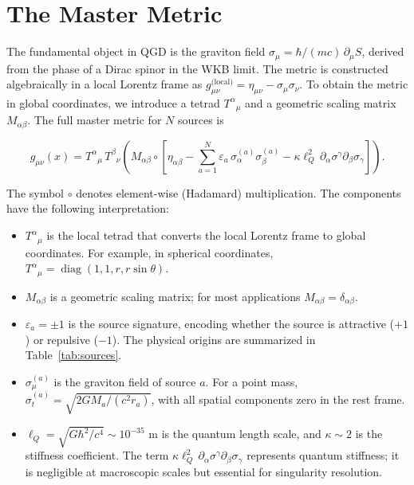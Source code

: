 \documentclass[12pt,prd,preprintnumbers,amsmath,amssymb]{revtex4-2}
\theoremstyle{definition}
\theoremstyle{remark}
\begin{document}
\section{The Master Metric}

The fundamental object in QGD is the graviton field $\sigma_\mu = \hbar/(mc)\,\partial_\mu S$, derived from the phase of a Dirac spinor in the WKB limit. The metric is constructed algebraically in a local Lorentz frame as $g_{\mu\nu}^{\text{(local)}} = \eta_{\mu\nu} - \sigma_\mu\sigma_\nu$. To obtain the metric in global coordinates, we introduce a tetrad $T^\alpha{}_\mu$ and a geometric scaling matrix $M_{\alpha\beta}$. The full master metric for $N$ sources is

\begin{equation}
\boxed{g_{\mu\nu}(x) = T^\alpha{}_\mu\,T^\beta{}_\nu\!\left(M_{\alpha\beta}\circ\!\left[\eta_{\alpha\beta} - \sum_{a=1}^N\varepsilon_a\,\sigma_\alpha^{(a)}\sigma_\beta^{(a)} - \kappa\ell_Q^2\,\partial_\alpha\sigma^\gamma\partial_\beta\sigma_\gamma\right]\right).}
\label{eq:master_metric}
\end{equation}

The symbol $\circ$ denotes element-wise (Hadamard) multiplication. The components have the following interpretation:

\begin{itemize}
\item $T^\alpha{}_\mu$ is the local tetrad that converts the local Lorentz frame to global coordinates. For example, in spherical coordinates, $T^\alpha{}_\mu = \operatorname{diag}(1,1,r,r\sin\theta)$.
\item $M_{\alpha\beta}$ is a geometric scaling matrix; for most applications $M_{\alpha\beta} = \delta_{\alpha\beta}$.
\item $\varepsilon_a = \pm 1$ is the source signature, encoding whether the source is attractive ($+1$) or repulsive ($-1$). The physical origins are summarized in Table~\ref{tab:sources}.
\item $\sigma_\mu^{(a)}$ is the graviton field of source $a$. For a point mass, $\sigma_t^{(a)} = \sqrt{2GM_a/(c^2 r_a)}$, with all spatial components zero in the rest frame.
\item $\ell_Q = \sqrt{G\hbar^2/c^4} \sim 10^{-35}$ m is the quantum length scale, and $\kappa \sim 2$ is the stiffness coefficient. The term $\kappa\ell_Q^2\,\partial_\alpha\sigma^\gamma\partial_\beta\sigma_\gamma$ represents quantum stiffness; it is negligible at macroscopic scales but essential for singularity resolution.
\end{itemize}
\end{document}

